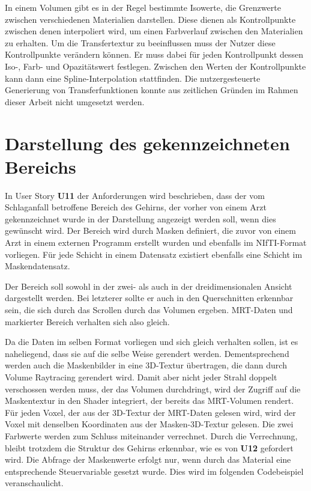 In einem Volumen gibt es in der Regel bestimmte Isowerte, die Grenzwerte zwischen verschiedenen Materialien darstellen. Diese dienen als Kontrollpunkte zwischen denen interpoliert wird, um einen Farbverlauf zwischen den Materialien zu erhalten. 
Um die Transfertextur zu beeinflussen muss der Nutzer diese Kontrollpunkte verändern können. Er muss dabei für jeden Kontrollpunkt dessen Iso-, Farb- und Opazitätswert festlegen. Zwischen den Werten der Kontrollpunkte kann dann eine Spline-Interpolation stattfinden.
Die nutzergesteuerte Generierung von Transferfunktionen konnte aus zeitlichen Gründen im Rahmen dieser Arbeit nicht umgesetzt werden.


\section{Darstellung des gekennzeichneten Bereichs}
\label{maske}


In User Story \textbf{U11} der Anforderungen wird beschrieben, dass der vom Schlaganfall betroffene Bereich des Gehirns, der vorher von einem Arzt gekennzeichnet wurde in der Darstellung angezeigt werden soll, wenn dies gewünscht wird. 
Der Bereich wird durch Masken definiert, die zuvor von einem Arzt in einem externen Programm erstellt wurden und ebenfalls im NIfTI-Format vorliegen. Für jede Schicht in einem Datensatz existiert ebenfalls eine Schicht im Maskendatensatz. 

Der Bereich soll sowohl in der zwei- als auch in der dreidimensionalen Ansicht dargestellt werden. Bei letzterer sollte er auch in den Querschnitten erkennbar sein, die sich durch das Scrollen durch das Volumen ergeben. MRT-Daten und markierter Bereich verhalten sich also gleich.

Da die Daten im selben Format vorliegen und sich gleich verhalten sollen, ist es naheliegend, dass sie auf die selbe Weise gerendert werden. Dementsprechend werden auch die Maskenbilder in eine 3D-Textur übertragen, die dann durch Volume Raytracing gerendert wird. Damit aber nicht jeder Strahl doppelt verschossen werden muss, der das Volumen durchdringt, wird der Zugriff auf die Maskentextur in den Shader integriert, der bereits das MRT-Volumen rendert. Für jeden Voxel, der aus der 3D-Textur der MRT-Daten gelesen wird, wird  der Voxel mit denselben Koordinaten aus der Masken-3D-Textur gelesen. Die zwei Farbwerte werden zum Schluss miteinander verrechnet. Durch die Verrechnung, bleibt trotzdem die Struktur des Gehirns erkennbar, wie es von \textbf{U12} gefordert wird. Die Abfrage der Maskenwerte erfolgt nur, wenn durch das Material eine entsprechende Steuervariable gesetzt wurde.
Dies wird im folgenden Codebeispiel veranschaulicht.

